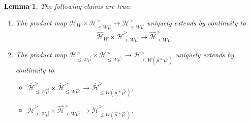 \documentclass{amsart}
\newcommand{\Hecke}{\mathcal{H}}
\newtheorem{Lem}[Thm]{Lemma}
\theoremstyle{definition}
\numberwithin{equation}{section}
\begin{document}
\begin{Lem}\label{Lem:completion_product}
The following claims are true:
\begin{enumerate}
\item The product map $\Hecke_W\times \Hecke^>_{\leqslant W\vec{\mu}}\rightarrow \Hecke^>_{\leqslant W\vec{\mu}}$ uniquely extends by continuity to $$\widehat{\Hecke}_W\times \breve{\Hecke}^>_{\leqslant W\vec{\mu}}\rightarrow
\widehat{\Hecke}^>_{\leqslant W\vec{\mu}}$$
\item The product map $\Hecke^>_{\leqslant W\vec{\mu}}\times \Hecke^>_{\leqslant W\vec{\mu}'}\rightarrow \Hecke^>_{\leqslant W(\vec{\mu}*\vec{\mu}')}$ uniquely extends by continuity to
\begin{itemize}
\item[(a)] $\widehat{\Hecke}^>_{\leqslant W\vec{\mu}}\times \widehat{\Hecke}^>_{\leqslant W\vec{\mu}'}\rightarrow \widehat{\Hecke}^>_{\leqslant W(\vec{\mu}*\vec{\mu}')}$,
\item[(b)]  $\breve{\Hecke}^>_{\leqslant W\vec{\mu}}\times \widehat{\Hecke}^>_{\leqslant W\vec{\mu}'}\rightarrow \breve{\Hecke}^>_{\leqslant W(\vec{\mu}*\vec{\mu}')}$.
\end{itemize}
\end{enumerate}
\end{Lem}
\end{document}
